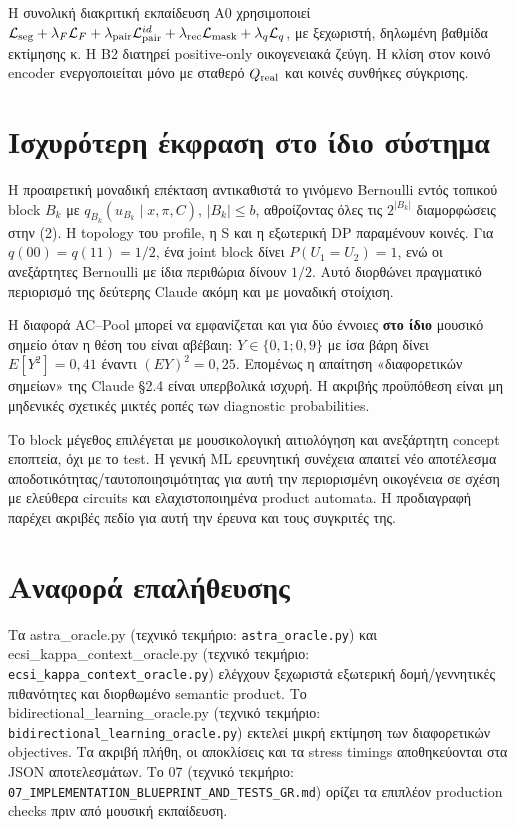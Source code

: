 \documentclass[
  10pt,
  a4paper,
]{report}
\begin{document}
Η συνολική διακριτική εκπαίδευση A0 χρησιμοποιεί
\(\mathcal L_{\rm seg}+\lambda_F\mathcal L_F+\lambda_{\rm pair}\mathcal L_{\rm pair}^{id}+\lambda_{\rm rec}\mathcal L_{\rm mask}+\lambda_q\mathcal L_q\),
με ξεχωριστή, δηλωμένη βαθμίδα εκτίμησης κ. Η B2 διατηρεί positive-only
οικογενειακά ζεύγη. Η κλίση στον κοινό encoder ενεργοποιείται μόνο με
σταθερό \(Q_{\rm real}\) και κοινές συνθήκες σύγκρισης.

\section{Ισχυρότερη έκφραση στο ίδιο
σύστημα}\label{ux3b9ux3c3ux3c7ux3c5ux3c1ux3ccux3c4ux3b5ux3c1ux3b7-ux3adux3baux3c6ux3c1ux3b1ux3c3ux3b7-ux3c3ux3c4ux3bf-ux3afux3b4ux3b9ux3bf-ux3c3ux3cdux3c3ux3c4ux3b7ux3bcux3b1}

Η προαιρετική μοναδική επέκταση αντικαθιστά το γινόμενο Bernoulli εντός
τοπικού block \(B_k\) με \(q_{B_k}(u_{B_k}\mid x,\pi,C)\),
\(|B_k|\le b\), αθροίζοντας όλες τις \(2^{|B_k|}\) διαμορφώσεις στην
(2). Η topology του profile, η S και η εξωτερική DP παραμένουν κοινές.
Για \(q(00)=q(11)=1/2\), ένα joint block δίνει \(P(U_1=U_2)=1\), ενώ οι
ανεξάρτητες Bernoulli με ίδια περιθώρια δίνουν \(1/2\). Αυτό διορθώνει
πραγματικό περιορισμό της δεύτερης Claude ακόμη και με μοναδική
στοίχιση.

Η διαφορά AC--Pool μπορεί να εμφανίζεται και για δύο έννοιες \textbf{στο
ίδιο} μουσικό σημείο όταν η θέση του είναι αβέβαιη:
\(Y\in\{0{,}1;0{,}9\}\) με ίσα βάρη δίνει \(E[Y^2]=0,41\) έναντι
\((EY)^2=0,25\). Επομένως η απαίτηση «διαφορετικών σημείων» της Claude
§2.4 είναι υπερβολικά ισχυρή. Η ακριβής προϋπόθεση είναι μη μηδενικές
σχετικές μικτές ροπές των diagnostic probabilities.

Το block μέγεθος επιλέγεται με μουσικολογική αιτιολόγηση και ανεξάρτητη
concept εποπτεία, όχι με το test. Η γενική ML ερευνητική συνέχεια
απαιτεί νέο αποτέλεσμα αποδοτικότητας/ταυτοποιησιμότητας για αυτή την
περιορισμένη οικογένεια σε σχέση με ελεύθερα circuits και
ελαχιστοποιημένα product automata. Η προδιαγραφή παρέχει ακριβές πεδίο
για αυτή την έρευνα και τους συγκριτές της.

\section{Αναφορά
επαλήθευσης}\label{ux3b1ux3bdux3b1ux3c6ux3bfux3c1ux3ac-ux3b5ux3c0ux3b1ux3bbux3aeux3b8ux3b5ux3c5ux3c3ux3b7ux3c2}

Τα astra\_oracle.py (τεχνικό τεκμήριο: \texttt{astra\_oracle.py}) και
ecsi\_kappa\_context\_oracle.py (τεχνικό τεκμήριο:
\texttt{ecsi\_kappa\_context\_oracle.py}) ελέγχουν ξεχωριστά εξωτερική
δομή/γεννητικές πιθανότητες και διορθωμένο semantic product. Το
bidirectional\_learning\_oracle.py (τεχνικό τεκμήριο:
\texttt{bidirectional\_learning\_oracle.py}) εκτελεί μικρή εκτίμηση των
διαφορετικών objectives. Τα ακριβή πλήθη, οι αποκλίσεις και τα stress
timings αποθηκεύονται στα JSON αποτελεσμάτων. Το 07 (τεχνικό τεκμήριο:
\texttt{07\_IMPLEMENTATION\_BLUEPRINT\_AND\_TESTS\_GR.md}) ορίζει τα
επιπλέον production checks πριν από μουσική εκπαίδευση.
\end{document}
